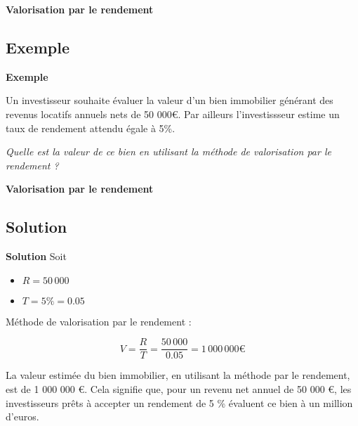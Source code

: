 \documentclass{beamer}
\begin{document}
\begin{frame}{\textbf{Valorisation par le rendement}}
\subsection{Exemple}
\begin{exampleblock}{\textbf{Exemple}}

Un investisseur souhaite évaluer la valeur d’un bien immobilier générant des revenus locatifs annuels nets de 50 000€. Par ailleurs l'investissseur estime un taux de rendement attendu égale à 5\%.

\vspace*{1cm}
\textit{Quelle est la valeur de ce bien en utilisant la méthode de valorisation par le rendement ?}

\end{exampleblock}


\end{frame}
\begin{frame}{\textbf{Valorisation par le rendement}}
\subsection{Solution}
	\begin{exampleblock}{\textbf{Solution}}
Soit

\begin{itemize}
	\item \( R = 50\,000\)
	\item \( T = 5\%=0.05\)
\end{itemize}

Méthode de valorisation par le rendement :

\[ V = \frac{R}{T} = \frac{50\,000}{0.05}= 1\,000\,000\text{€} \]

La valeur estimée du bien immobilier, en utilisant la méthode par le rendement, est de 1 000 000 €. Cela signifie que, pour un revenu net annuel de 50 000 €, les investisseurs prêts à accepter un rendement de 5 \% évaluent ce bien à un million d’euros.
		
	\end{exampleblock}
	
	
\end{frame}
\end{document}
